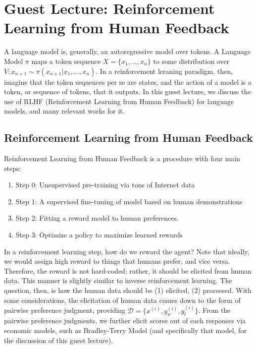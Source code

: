 \chapter{Guest Lecture: Reinforcement Learning from Human Feedback}
A language model is, generally, an autoregressive model over tokens.
A Language Model $\pi$ maps a token sequence $X = \{x_1, \dots, x_n\}$ to some distribution over $V: x_{n+1} \sim \pi(x_{n+1} | x_1, \dots, x_n)$.
In a reinforcement leraning paradigm, then, imagine that the token sequences per se are states, and the action of a model is a token, or sequence of tokens, that it outputs.
In this guest lecture, we discuss the use of RLHF (Reinforcement Learning from Human Feedback) for language models, and many relevant works for it.

\section{Reinforcement Learning from Human Feedback}
Reinforcement Learning from Human Feedback is a procedure with four main steps:
\begin{enumerate}
    \item Step 0: Unsupervised pre-training via tons of Internet data
    \item Step 1: A supervised fine-tuning of model based on human demonstrations
    \item Step 2: Fitting a reward model to human preferences.
    \item Step 3: Optimize a policy to maximize learned rewards
\end{enumerate}

In a reinforcement learning step, how do we reward the agent?
Note that ideally, we would assign high reward to things that humans prefer, and vice versa.
Therefore, the reward is not hard-coded; rather, it should be elicited from human data.
This manner is slightly similar to inverse reinforcement learning.
The question, then, is how the human data should be (1) elicited, (2) processed.
With some considerations, the elicitation of human data comes down to the form of pairwise preference judgment, providing $\mathcal{D} = \{x^{(i)}, y_w^{(i)}, y_l^{(i)}\}$.
From the pairwise preference judgments, we further elicit scores out of each responses via economic models, such as Bradley-Terry Model (and specifically that model, for the discussion of this guest lecture).

